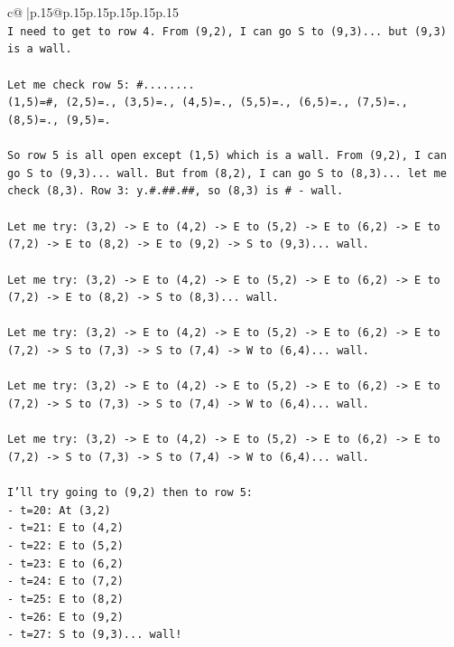 \documentclass{article}
\begin{document}
{\begin{supertabular}{c@{$\;$}|p{.15\linewidth}@{}p{.15\linewidth}p{.15\linewidth}p{.15\linewidth}p{.15\linewidth}p{.15\linewidth}}
{{{\\ 
\texttt{I need to get to row 4. From (9,2), I can go S to (9,3)... but (9,3) is a wall.} \\
\\ 
\texttt{Let me check row 5: \#........ } \\
\texttt{(1,5)=\#, (2,5)=., (3,5)=., (4,5)=., (5,5)=., (6,5)=., (7,5)=., (8,5)=., (9,5)=.} \\
\\ 
\texttt{So row 5 is all open except (1,5) which is a wall. From (9,2), I can go S to (9,3)... wall. But from (8,2), I can go S to (8,3)... let me check (8,3). Row 3: y.\#.\#\#.\#\#, so (8,3) is \# {-} wall.} \\
\\ 
\texttt{Let me try: (3,2) {-}> E to (4,2) {-}> E to (5,2) {-}> E to (6,2) {-}> E to (7,2) {-}> E to (8,2) {-}> E to (9,2) {-}> S to (9,3)... wall.} \\
\\ 
\texttt{Let me try: (3,2) {-}> E to (4,2) {-}> E to (5,2) {-}> E to (6,2) {-}> E to (7,2) {-}> E to (8,2) {-}> S to (8,3)... wall.} \\
\\ 
\texttt{Let me try: (3,2) {-}> E to (4,2) {-}> E to (5,2) {-}> E to (6,2) {-}> E to (7,2) {-}> S to (7,3) {-}> S to (7,4) {-}> W to (6,4)... wall.} \\
\\ 
\texttt{Let me try: (3,2) {-}> E to (4,2) {-}> E to (5,2) {-}> E to (6,2) {-}> E to (7,2) {-}> S to (7,3) {-}> S to (7,4) {-}> W to (6,4)... wall.} \\
\\ 
\texttt{Let me try: (3,2) {-}> E to (4,2) {-}> E to (5,2) {-}> E to (6,2) {-}> E to (7,2) {-}> S to (7,3) {-}> S to (7,4) {-}> W to (6,4)... wall.} \\
\\ 
\texttt{I'll try going to (9,2) then to row 5:} \\
\texttt{{-} t=20: At (3,2)} \\
\texttt{{-} t=21: E to (4,2)} \\
\texttt{{-} t=22: E to (5,2)} \\
\texttt{{-} t=23: E to (6,2)} \\
\texttt{{-} t=24: E to (7,2)} \\
\texttt{{-} t=25: E to (8,2)} \\
\texttt{{-} t=26: E to (9,2)} \\
\texttt{{-} t=27: S to (9,3)... wall!} \\
}}}
\end{supertabular}}
\end{document}
